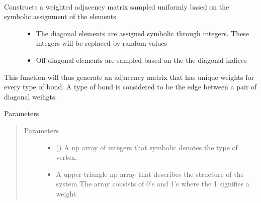 \documentclass[letterpaper,10pt,english]{sphinxmanual}
\begin{document}
\begin{fulllineitems}
\begin{fulllineitems}
\label{\detokenize{modules/gqcml.data_generators:gqcml.data_generators.graph_sampler.graph_sampler.sample_inhomogeneous_matrix}}~\begin{description}
\item[{Constructs a weighted adjacency matrix sampled uniformly based on the symbolic assignment of the elements}] \leavevmode\begin{itemize}
\item {} 
The diagonal elements are assigned symbolic through integers. These integers will be replaced by random values

\item {} 
Off diagonal elements are sampled based on the the diagonal indices

\end{itemize}

\end{description}

This function will thus generate an adjacency matrix that has unique weights for every type of bond.
A type of bond is considered to be the edge between a pair of diagonal weihgts.

Parameters
\begin{quote}\begin{description}
\item[{Parameters}] \leavevmode\begin{itemize}
\item {} 
\sphinxstyleliteralstrong{\sphinxupquote{(}}\sphinxstyleliteralstrong{\sphinxupquote{)}} () \textendash{} A np array of integers that symbolic denotes the type of vertex.

\item {} 
\sphinxstyleliteralstrong{\sphinxupquote{(}}\sphinxstyleliteralstrong{\sphinxupquote{)}} \textendash{} A upper triangle np array that describes the structure of the system
The array consists of 0’s and 1’s where the 1 signifies a weight.


\end{itemize}
\end{description}
\end{quote}
\end{fulllineitems}
\end{fulllineitems}
\end{document}
